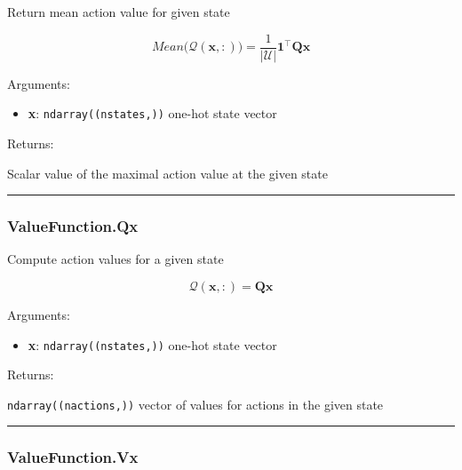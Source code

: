 Return mean action value for given state

\[
Mean \big(\mathcal Q(\mathbf x, :)\big) = \frac{1}{|\mathcal U|} \mathbf 1^\top \mathbf Q \mathbf x
\]

Arguments:

\begin{itemize}
\tightlist
\item
  \textbf{x}: \texttt{ndarray((nstates,))} one-hot state vector
\end{itemize}

Returns:

Scalar value of the maximal action value at the given state

\begin{center}\rule{0.5\linewidth}{\linethickness}\end{center}

\hypertarget{valuefunction.qx}{%
\subsubsection{ValueFunction.Qx}\label{valuefunction.qx}}

\begin{Shaded}
\begin{Highlighting}[]
\end{Highlighting}
\end{Shaded}

Compute action values for a given state

\[
\mathcal Q(\mathbf x, :) = \mathbf Q \mathbf x
\]

Arguments:

\begin{itemize}
\tightlist
\item
  \textbf{x}: \texttt{ndarray((nstates,))} one-hot state vector
\end{itemize}

Returns:

\texttt{ndarray((nactions,))} vector of values for actions in the given
state

\begin{center}\rule{0.5\linewidth}{\linethickness}\end{center}

\hypertarget{valuefunction.vx}{%
\subsubsection{ValueFunction.Vx}\label{valuefunction.vx}}

